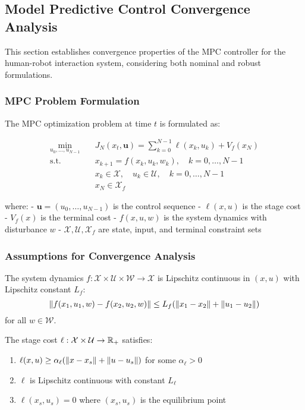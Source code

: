 \subsection{Model Predictive Control Convergence Analysis}

This section establishes convergence properties of the MPC controller for the human-robot interaction system, considering both nominal and robust formulations.

\subsubsection{MPC Problem Formulation}

The MPC optimization problem at time $t$ is formulated as:

\begin{align}
\label{eq:mpc_problem}
\min_{u_0, \ldots, u_{N-1}} \quad & J_N(x_t, \mathbf{u}) = \sum_{k=0}^{N-1} \ell(x_k, u_k) + V_f(x_N) \\
\text{s.t.} \quad & x_{k+1} = f(x_k, u_k, w_k), \quad k = 0, \ldots, N-1 \\
& x_k \in \mathcal{X}, \quad u_k \in \mathcal{U}, \quad k = 0, \ldots, N-1 \\
& x_N \in \mathcal{X}_f
\end{align}

where:
- $\mathbf{u} = (u_0, \ldots, u_{N-1})$ is the control sequence
- $\ell(x, u)$ is the stage cost
- $V_f(x)$ is the terminal cost
- $f(x, u, w)$ is the system dynamics with disturbance $w$
- $\mathcal{X}, \mathcal{U}, \mathcal{X}_f$ are state, input, and terminal constraint sets

\subsubsection{Assumptions for Convergence Analysis}

\begin{assumption}
\label{ass:dynamics}
The system dynamics $f: \mathcal{X} \times \mathcal{U} \times \mathcal{W} \rightarrow \mathcal{X}$ is Lipschitz continuous in $(x, u)$ with Lipschitz constant $L_f$:
$$\lVert f(x_1, u_1, w) - f(x_2, u_2, w)\rVert \leq L_f (\lVert x_1 - x_2\rVert + \lVert u_1 - u_2\rVert)$$
for all $w \in \mathcal{W}$.
\end{assumption}

\begin{assumption}
\label{ass:stage_cost}
The stage cost $\ell: \mathcal{X} \times \mathcal{U} \rightarrow \mathbb{R}_+$ satisfies:
\begin{enumerate}
    \item $\ell(x, u) \geq \alpha_\ell(\lVert x - x_s\rVert + \lVert u - u_s\rVert)$ for some $\alpha_\ell > 0$
    \item $\ell$ is Lipschitz continuous with constant $L_\ell$
    \item $\ell(x_s, u_s) = 0$ where $(x_s, u_s)$ is the equilibrium point
\end{enumerate}
\end{assumption}

